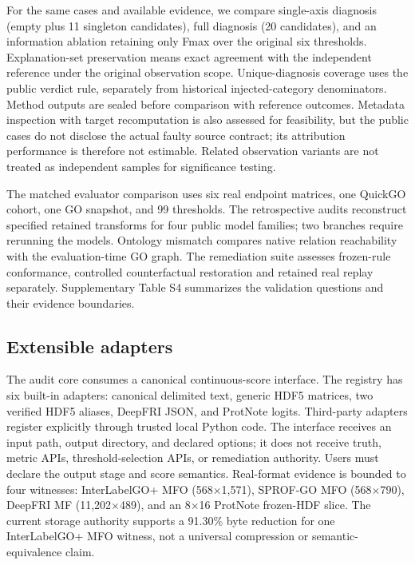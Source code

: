 \documentclass[11pt]{article}
\begin{document}
For the same cases and available evidence, we compare single-axis diagnosis (empty plus 11 singleton candidates), full diagnosis (20 candidates), and an information ablation retaining only Fmax over the original six thresholds. Explanation-set preservation means exact agreement with the independent reference under the original observation scope. Unique-diagnosis coverage uses the public verdict rule, separately from historical injected-category denominators. Method outputs are sealed before comparison with reference outcomes. Metadata inspection with target recomputation is also assessed for feasibility, but the public cases do not disclose the actual faulty source contract; its attribution performance is therefore not estimable. Related observation variants are not treated as independent samples for significance testing.

The matched evaluator comparison uses six real endpoint matrices, one QuickGO cohort, one GO snapshot, and 99 thresholds. The retrospective audits reconstruct specified retained transforms for four public model families; two branches require rerunning the models. Ontology mismatch compares native relation reachability with the evaluation-time GO graph. The remediation suite assesses frozen-rule conformance, controlled counterfactual restoration and retained real replay separately. Supplementary Table S4 summarizes the validation questions and their evidence boundaries.

\subsection{Extensible adapters}
The audit core consumes a canonical continuous-score interface. The registry has six built-in adapters: canonical delimited text, generic HDF5 matrices, two verified HDF5 aliases, DeepFRI JSON, and ProtNote logits. Third-party adapters register explicitly through trusted local Python code. The interface receives an input path, output directory, and declared options; it does not receive truth, metric APIs, threshold-selection APIs, or remediation authority. Users must declare the output stage and score semantics. Real-format evidence is bounded to four witnesses: InterLabelGO+ MFO (568$\times$1,571), SPROF-GO MFO (568$\times$790), DeepFRI MF (11,202$\times$489), and an 8$\times$16 ProtNote frozen-HDF slice. The current storage authority supports a 91.30\% byte reduction for one InterLabelGO+ MFO witness, not a universal compression or semantic-equivalence claim.
\end{document}
